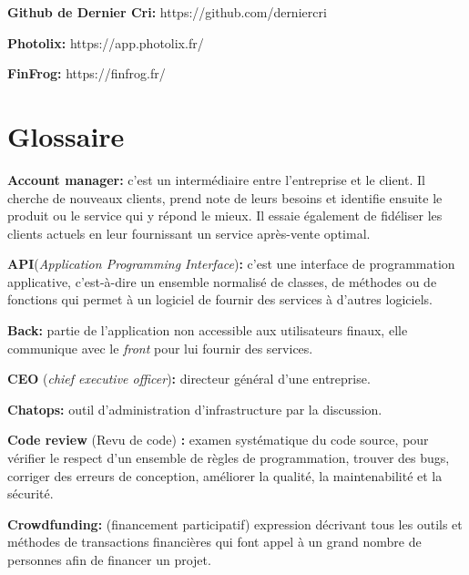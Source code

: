 \documentclass[12pt,a4paper]{article}
\begin{document}
  \bigskip

  \textbf{Github de Dernier Cri:} https://github.com/derniercri

  \bigskip

  \textbf{Photolix:} https://app.photolix.fr/

  \bigskip

  \textbf{FinFrog:} https://finfrog.fr/

  \newpage

  \section{Glossaire}\label{glossaire}

  \textbf{Account manager:} c'est un intermédiaire entre l'entreprise et
  le client. Il cherche de nouveaux clients, prend note de leurs besoins
  et identifie ensuite le produit ou le service qui y répond le mieux. Il
  essaie également de fidéliser les clients actuels en leur fournissant un
  service après-vente optimal.

  \bigskip

  \textbf{API}(\emph{Application Programming Interface})\textbf{:} c'est
  une interface de programmation applicative, c'est-à-dire un ensemble
  normalisé de classes, de méthodes ou de fonctions qui permet à un
  logiciel de fournir des services à d'autres logiciels.

  \bigskip

  \textbf{Back:} partie de l'application non accessible aux utilisateurs
  finaux, elle communique avec le \emph{front} pour lui fournir des
  services.

  \bigskip

  \textbf{CEO} (\emph{chief executive officer})\textbf{:} directeur
  général d'une entreprise.

  \bigskip

  \textbf{Chatops:} outil d'administration d'infrastructure par la
  discussion.

  \bigskip

  \textbf{Code review} (Revu de code) \textbf{:} examen systématique du
  code source, pour vérifier le respect d'un ensemble de règles de
  programmation, trouver des bugs, corriger des erreurs de conception,
  améliorer la qualité, la maintenabilité et la sécurité.

  \bigskip

  \textbf{Crowdfunding:} (financement participatif) expression décrivant
  tous les outils et méthodes de transactions financières qui font appel à
  un grand nombre de personnes afin de financer un projet.
\end{document}
